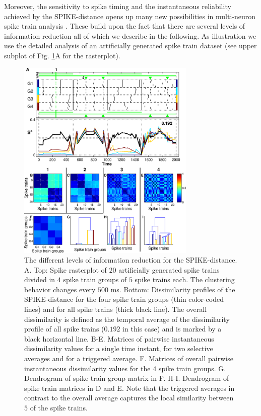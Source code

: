 \documentclass[10pt,twocolumn]{elsart5p}
\begin{document}
Moreover, the sensitivity to spike timing and the instantaneous reliability achieved by the SPIKE-distance opens up many new possibilities in multi-neuron spike train analysis \citep{Kreuz13}. These build upon the fact that there are several levels of information reduction all of which we describe in the following. As illustration we use the detailed analysis of an artificially generated spike train dataset (see upper subplot of Fig. \ref{fig:Fig2-SPIKE-Representations}A for the rasterplot). 
%
%
\begin{figure}
    \includegraphics[width=85mm]{Fig2_SPIKE_Representations.eps}
    \caption{\abb\label{fig:Fig2-SPIKE-Representations} The different levels of information reduction for the SPIKE-distance.  A. Top: Spike rasterplot of $20$ artificially generated spike trains divided in $4$ spike train groups of $5$ spike trains each. The clustering behavior changes every $500$ ms. Bottom: Dissimilarity profiles of the SPIKE-distance for the four spike train groups (thin color-coded lines) and for all spike trains (thick black line). The overall dissimilarity is defined as the temporal average of the dissimilarity profile of all spike trains ($0.192$ in this case) and is marked by a black horizontal line.  B-E. Matrices of pairwise instantaneous dissimilarity values for a single time instant, for two selective averages and for a triggered average.  F. Matrices of overall pairwise instantaneous dissimilarity values for the $4$ spike train groups.  G. Dendrogram of spike train group matrix in F.  H-I. Dendrogram of spike train matrices in D and E. Note that the triggered averages in contrast to the overall average captures the local similarity between $5$ of the spike trains.}
\end{figure}
\end{document}
